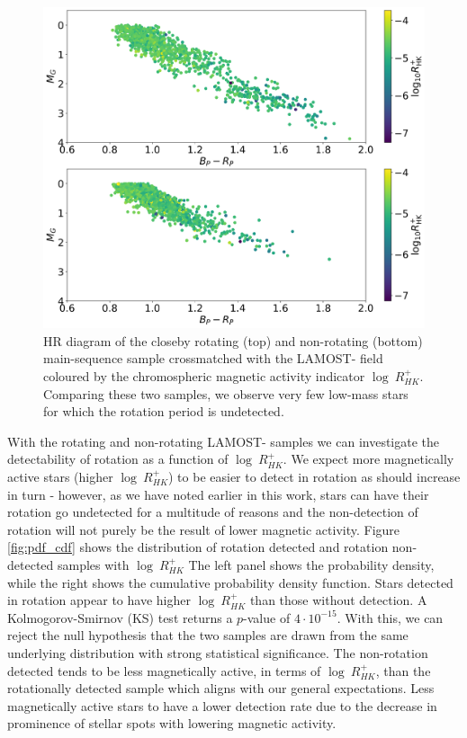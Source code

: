 \begin{figure}
\centering
  \includegraphics[width=\textwidth]{Figures/rot_gap_figures/HR_mag_and_non_rot.png}
  \caption[HR diagram of the closeby rotating (top) and non-rotating (bottom) main-sequence sample crossmatched with the LAMOST-\kepler{} field coloured by the chromospheric magnetic activity indicator $\log \ R^{+}_{HK}$.]{
  HR diagram of the closeby rotating (top) and non-rotating (bottom) main-sequence sample crossmatched with the LAMOST-\kepler{} field coloured by the chromospheric magnetic activity indicator $\log \ R^{+}_{HK}$.
  Comparing these two samples, we observe very few low-mass stars for which the rotation period is undetected.}
  \label{fig:non_rotating_mag_hr}
\end{figure}

With the rotating and non-rotating LAMOST-\kepler{} samples we can investigate the detectability of rotation as a function of $\log \ R^{+}_{HK}$.
We expect more magnetically active stars (higher $\log \ R^{+}_{HK}$) to be easier to detect in rotation as \rper{} should increase in turn - however, as we have noted earlier in this work, stars can have their rotation go undetected for a multitude of reasons and the non-detection of rotation will not purely be the result of lower magnetic activity.
Figure \ref{fig:pdf_cdf} shows the distribution of rotation detected and rotation non-detected samples with $\log \ R^{+}_{HK}$
The left panel shows the probability density, while the right shows the cumulative probability density function.
Stars detected in rotation appear to have higher $\log \ R^{+}_{HK}$ than those without detection.
A Kolmogorov-Smirnov (KS) test returns a $p$-value of $4 \cdot10^{-15}$.
With this, we can reject the null hypothesis that the two samples are drawn from the same underlying distribution with strong statistical significance.
The non-rotation detected tends to be less magnetically active, in terms of $\log \ R^{+}_{HK}$, than the rotationally detected sample which aligns with our general expectations.
Less magnetically active stars to have a lower detection rate due to the decrease in prominence of stellar spots with lowering magnetic activity.

